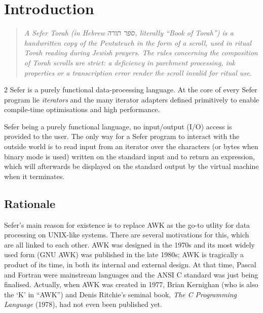 \chapter{Introduction}
\begin{quote}
  \itshape A \emph{Sefer Torah} (in Hebrew \texthebrew{ספר תורה},
  literally ``Book of Torah'') is a handwritten copy of the Pentateuch
  in the form of a scroll, used in ritual Torah reading during Jewish
  prayers. The rules concerning the composition of Torah scrolls are
  strict: a deficiency in parchment processing, ink properties or a
  transcription error render the scroll invalid for ritual use.
\end{quote}

\begin{multicols*}{2}
  Sefer is a purely functional data-processing language. At the core
  of every Sefer program lie \emph{iterators} and the many iterator
  adapters defined primitively to enable compile-time optimisations
  and high performance.

  Sefer being a purely functional language, no input/output (I/O)
  access is provided to the user. The only way for a Sefer program to
  interact with the outside world is to read input from an iterator
  over the characters (or bytes when binary mode is used) written on
  the standard input and to return an expression, which will
  afterwards be displayed on the standard output by the virtual
  machine when it terminates.

  \section{Rationale}

  Sefer's main reason for existence is to replace AWK as the go-to
  utlity for data processing on UNIX-like systems. There are several
  motivations for this, which are all linked to each other. AWK was
  designed in the 1970s and its most widely used form (GNU AWK) was
  published in the late 1980s; AWK is tragically a product of its
  time, in both its internal and external design. At that time, Pascal
  and Fortran were mainstream languages and the ANSI C standard was
  just being finalised. Actually, when AWK was created in 1977, Brian
  Kernighan (who is also the `K' in ``AWK'') and Denis Ritchie's
  seminal book, \emph{The C Programming Language} (1978), had not even
  been published yet.


\end{multicols*}
